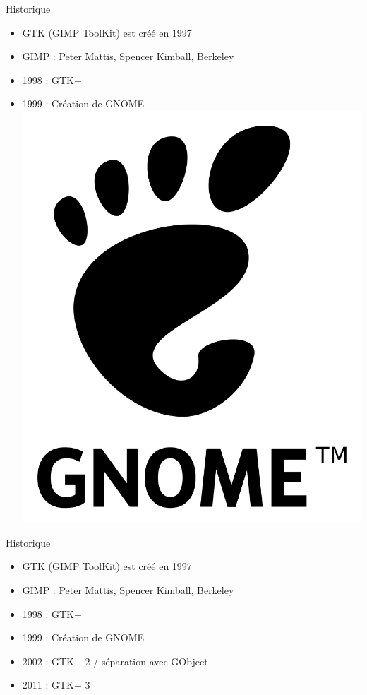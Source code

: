 \documentclass{beamer}
\begin{document}
\begin{frame}{Historique}
  \begin{itemize}
  	\item GTK (GIMP ToolKit) est créé en 1997
    \item GIMP : Peter Mattis, Spencer Kimball, Berkeley 
    \item 1998 : GTK+ \pause
    \item 1999 : Création de GNOME \linebreak \includegraphics[scale=0.05]{Pictures/GNOME.png} 
   \end{itemize}
\end{frame}
\begin{frame}{Historique}
  \begin{itemize}
  	\item GTK (GIMP ToolKit) est créé en 1997
    \item GIMP : Peter Mattis, Spencer Kimball, Berkeley 
    \item 1998 : GTK+ 
    \item 1999 : Création de GNOME
    \item 2002 : GTK+ 2 / séparation avec GObject  \pause
    \item 2011 : GTK+ 3 
   \end{itemize}
\end{frame}
\end{document}
